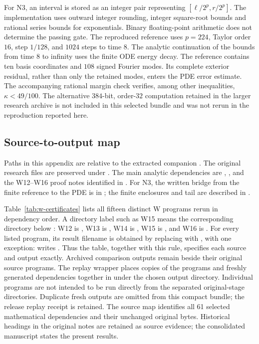 For N3, an interval is stored as an integer pair representing
\([\ell/2^p,r/2^p]\).  The implementation uses outward integer rounding,
integer square-root bounds and rational series bounds for exponentials.
Binary floating-point arithmetic does not determine the passing gate.  The
reproduced reference uses \(p=224\), Taylor order \(16\), step \(1/128\), and
\(1024\) steps to time \(8\).  The analytic continuation of the bounds from
time \(8\) to infinity uses the finite ODE energy decay.  The reference
contains ten basis coordinates and \(108\) signed Fourier modes.  Its complete
exterior residual, rather than only the retained modes, enters the PDE error
estimate.  The accompanying rational margin check verifies, among other
inequalities, \(\kappa<49/100\).  The alternative
\(384\)-bit, order-\(32\) computation retained in the larger research archive
is not included in this selected bundle and was not rerun in the
reproduction reported here.

\subsection{Source-to-output map}

Paths in this appendix are relative to the extracted companion
. The original research files are preserved under
.  The main analytic dependencies are
,
, and the W12--W16
proof notes identified in .  For N3, the written bridge
from the finite reference to the PDE is in
; the finite enclosures and tail are
described in .

Table~\ref{tab:w-certificates} lists all fifteen distinct W programs rerun in
dependency order.  A directory label such as W15 means the corresponding
directory below : W12 is
, W13 is ,
W14 is , W15 is , and
W16 is .  For every listed program, its result
filename is obtained by replacing  with , with
one exception:  writes
.  Thus the table, together with this
rule, specifies each source and output exactly. Archived comparison outputs
remain beside their original source programs. The replay wrapper places
copies of the programs and freshly generated dependencies together in
 under the chosen output directory. Individual programs
are not intended to be run directly from the separated original-stage
directories. Duplicate fresh outputs are omitted from this compact bundle;
the release replay receipt is retained. The source map identifies all 61
selected mathematical dependencies and their unchanged original bytes.
Historical headings in the original notes are retained as source evidence;
the consolidated manuscript states the present results.

